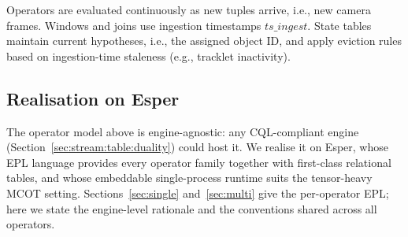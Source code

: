 \documentclass[5p,times]{elsarticle}
\begin{document}

Operators are evaluated continuously as new tuples arrive, i.e., new camera frames. Windows and joins use ingestion timestamps $\textit{ts\_ingest}$. State tables maintain current hypotheses, i.e., the assigned object ID, and apply eviction rules based on ingestion-time staleness (e.g., tracklet inactivity).



\subsection{Realisation on Esper}
\label{sec:overview:realisation}
The operator model above is engine-agnostic: any CQL-compliant engine (Section~\ref{sec:stream:table:duality}) could host it. We realise it on Esper, whose EPL language provides every operator family together with first-class relational tables, and whose embeddable single-process runtime suits the tensor-heavy MCOT setting. Sections~\ref{sec:single} and~\ref{sec:multi} give the per-operator EPL; here we state the engine-level rationale and the conventions shared across all operators.
\end{document}
